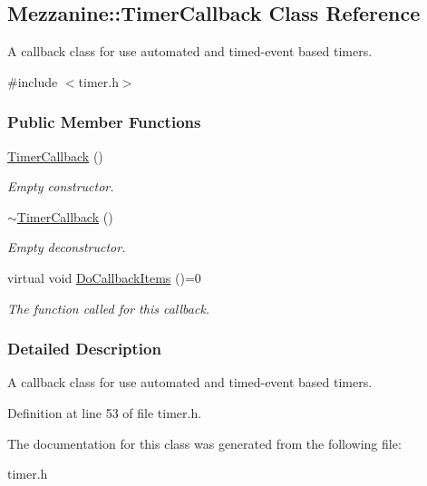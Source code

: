 \hypertarget{classMezzanine_1_1TimerCallback}{
\subsection{Mezzanine::TimerCallback Class Reference}
\label{classMezzanine_1_1TimerCallback}
}


A callback class for use automated and timed-\/event based timers.  




{\ttfamily \#include $<$timer.h$>$}

\subsubsection*{Public Member Functions}
\begin{DoxyCompactItemize}
\item 
\hypertarget{classMezzanine_1_1TimerCallback_ae6152f02cb5ddf36f76f0b892e18d065}{
\hyperlink{classMezzanine_1_1TimerCallback_ae6152f02cb5ddf36f76f0b892e18d065}{TimerCallback} ()}
\label{classMezzanine_1_1TimerCallback_ae6152f02cb5ddf36f76f0b892e18d065}

\begin{DoxyCompactList}\small\item\em Empty constructor. \item\end{DoxyCompactList}\item 
\hypertarget{classMezzanine_1_1TimerCallback_a589a3635b86895c849401b7b3d050e20}{
\hyperlink{classMezzanine_1_1TimerCallback_a589a3635b86895c849401b7b3d050e20}{$\sim$TimerCallback} ()}
\label{classMezzanine_1_1TimerCallback_a589a3635b86895c849401b7b3d050e20}

\begin{DoxyCompactList}\small\item\em Empty deconstructor. \item\end{DoxyCompactList}\item 
\hypertarget{classMezzanine_1_1TimerCallback_a2a4d7964f1867713ba472dc4c94361a8}{
virtual void \hyperlink{classMezzanine_1_1TimerCallback_a2a4d7964f1867713ba472dc4c94361a8}{DoCallbackItems} ()=0}
\label{classMezzanine_1_1TimerCallback_a2a4d7964f1867713ba472dc4c94361a8}

\begin{DoxyCompactList}\small\item\em The function called for this callback. \item\end{DoxyCompactList}\end{DoxyCompactItemize}


\subsubsection{Detailed Description}
A callback class for use automated and timed-\/event based timers. 

Definition at line 53 of file timer.h.



The documentation for this class was generated from the following file:\begin{DoxyCompactItemize}
\item 
timer.h\end{DoxyCompactItemize}
